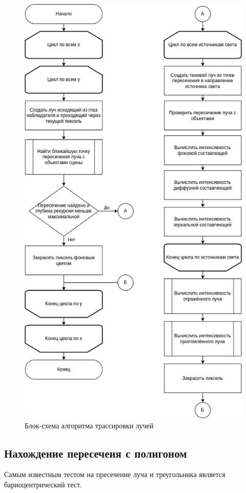 \documentclass[12pt,a4paper,oneside]{report}
\begin{document}
				\begin{figure}
					\centering
					\includegraphics[scale=0.6]{trace_block}
					\caption{Блок-схема алгоритма трассировки лучей}
				\end{figure}
				
			\subsection{Нахождение пересечеия с полигоном}
				\quad Самым известным тестом на пресечение луча и треугольника является бариоцентрический тест.
				
\end{document}
